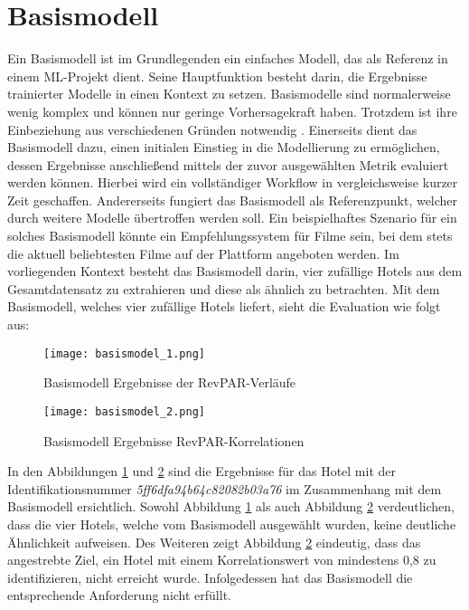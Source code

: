 \section{Basismodell}
\label{subsubsec:Basismodel}
Ein Basismodell ist im Grundlegenden ein einfaches Modell, das als Referenz in einem ML-Projekt dient. Seine Hauptfunktion besteht darin, die Ergebnisse trainierter Modelle in einen Kontext zu setzen. Basismodelle sind normalerweise wenig komplex und können nur geringe Vorhersagekraft haben. Trotzdem ist ihre Einbeziehung aus verschiedenen Gründen notwendig \cite{Nair.04.04.2022}.
\newline
\newline
Einerseits dient das Basismodell dazu, einen initialen Einstieg in die Modellierung zu ermöglichen, dessen Ergebnisse anschließend mittels der zuvor ausgewählten Metrik evaluiert werden können. Hierbei wird ein vollständiger Workflow in vergleichsweise kurzer Zeit geschaffen. Andererseits fungiert das Basismodell als Referenzpunkt, welcher durch weitere Modelle übertroffen werden soll. Ein beispielhaftes Szenario für ein solches Basismodell könnte ein Empfehlungssystem für Filme sein, bei dem stets die aktuell beliebtesten Filme auf der Plattform angeboten werden.
\newline
\newline
Im vorliegenden Kontext besteht das Basismodell darin, vier zufällige Hotels aus dem Gesamtdatensatz zu extrahieren und diese als ähnlich zu betrachten. Mit dem Basismodell, welches vier zufällige Hotels liefert, sieht die Evaluation wie folgt aus:

\begin{figure}[h]
    \centering
    \texttt{[image: basismodel\_1.png]}
    \caption[Basismodell Ergebnisse der RevPAR-Verläufe]{Basismodell Ergebnisse der RevPAR-Verläufe}
    \label{img:basismodell_1}
\end{figure}

\begin{figure}[h]
    \centering
    \texttt{[image: basismodel\_2.png]}
    \caption[Basismodell Ergebnisse der RevPAR-Korrelationen]{Basismodell Ergebnisse RevPAR-Korrelationen}
    \label{img:basismodell_2}
\end{figure}

In den Abbildungen \ref{img:basismodell_1} und \ref{img:basismodell_2} sind die Ergebnisse für das Hotel mit der Identifikationsnummer \emph{5ff6dfa94b64c82082b03a76} im Zusammenhang mit dem Basismodell ersichtlich. Sowohl Abbildung \ref{img:basismodell_1} als auch Abbildung \ref{img:basismodell_2} verdeutlichen, dass die vier Hotels, welche vom Basismodell ausgewählt wurden, keine deutliche Ähnlichkeit aufweisen. Des Weiteren zeigt Abbildung \ref{img:basismodell_2} eindeutig, dass das angestrebte Ziel, ein Hotel mit einem Korrelationswert von mindestens 0,8 zu identifizieren, nicht erreicht wurde. Infolgedessen hat das Basismodell die entsprechende Anforderung nicht erfüllt.

